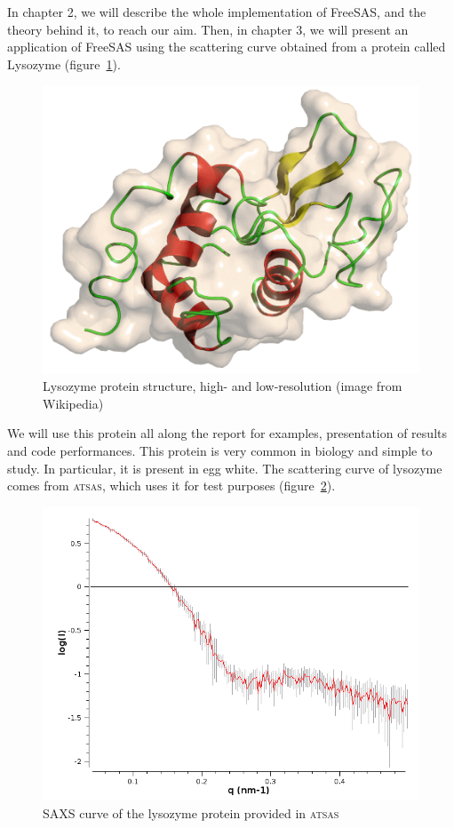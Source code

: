 \documentclass[a4paper, 11pt]{report}
\begin{document}
In chapter 2, we will describe the whole implementation of FreeSAS, 
and the theory behind it, to reach our aim. 
Then, in chapter 3, we will present an application of FreeSAS using the 
scattering curve obtained from a protein called Lysozyme 
(figure~\ref{fgr:lysozyme}). 
\begin{figure}
\centering
\includegraphics[scale=0.2]{lysozyme_wiki.png}
\caption{Lysozyme protein structure, high- and low-resolution (image 
  from Wikipedia)}
\label{fgr:lysozyme}
\end{figure}

We will use this protein all along the report for examples, 
presentation of results and code performances. 
This protein is very common in biology and simple to study. 
In particular, it is present in egg white. 
The scattering curve of lysozyme comes from \textsc{atsas}, which uses 
it for test purposes (figure~\ref{fgr:saxscurve}).

\begin{figure}
\centering
\includegraphics[scale=0.45]{saxscurve.png}
\caption{SAXS curve of the lysozyme protein provided in \textsc{atsas}}
\label{fgr:saxscurve}
\end{figure}
\end{document}
